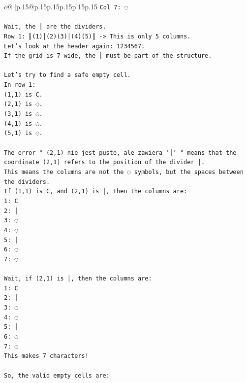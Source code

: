 \documentclass{article}
\begin{document}
{\begin{supertabular}{c@{$\;$}|p{.15\linewidth}@{}p{.15\linewidth}p{.15\linewidth}p{.15\linewidth}p{.15\linewidth}p{.15\linewidth}}
{{{\texttt{Col 7: ◌} \\
\\ 
\texttt{Wait, the │ are the dividers.} \\
\texttt{Row 1: ║(1)│(2)(3)│(4)(5)║ {-}> This is only 5 columns.} \\
\texttt{Let's look at the header again: 1234567.} \\
\texttt{If the grid is 7 wide, the │ must be part of the structure.} \\
\\ 
\texttt{Let's try to find a safe empty cell.} \\
\texttt{In row 1:} \\
\texttt{(1,1) is C.} \\
\texttt{(2,1) is ◌.} \\
\texttt{(3,1) is ◌.} \\
\texttt{(4,1) is ◌.} \\
\texttt{(5,1) is ◌.} \\
\\ 
\texttt{The error " (2,1) nie jest puste, ale zawiera '│' " means that the coordinate (2,1) refers to the position of the divider │.} \\
\texttt{This means the columns are not the ◌ symbols, but the spaces between the dividers.} \\
\texttt{If (1,1) is C, and (2,1) is │, then the columns are:} \\
\texttt{1: C} \\
\texttt{2: │} \\
\texttt{3: ◌} \\
\texttt{4: ◌} \\
\texttt{5: │} \\
\texttt{6: ◌} \\
\texttt{7: ◌} \\
\\ 
\texttt{Wait, if (2,1) is │, then the columns are:} \\
\texttt{1: C} \\
\texttt{2: │} \\
\texttt{3: ◌} \\
\texttt{4: ◌} \\
\texttt{5: │} \\
\texttt{6: ◌} \\
\texttt{7: ◌} \\
\texttt{This makes 7 characters!} \\
\\ 
\texttt{So, the valid empty cells are:} \\
}}}
\end{supertabular}}
\end{document}
